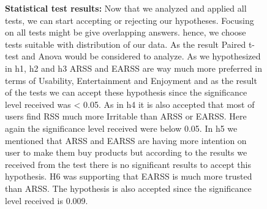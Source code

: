 \documentclass[letterpaper, 10 pt, conference]{ieeeconf}
\begin{document}
\begin{figure}[h!]
\textbf{Statistical test results:} Now that we analyzed and applied all tests, we can start accepting or rejecting our hypotheses. Focusing on all tests might be give overlapping answers. hence, we choose tests suitable with distribution of our data. As the result Paired t-test and Anova would be considered to analyze. 
As we hypothesized in h1, h2 and h3 ARSS and EARSS are way much more preferred in terms of Usability, Entertainment and Enjoyment and as the result of the tests we can accept these hypothesis since the significance level received was < 0.05. As in h4 it is also accepted that most of users find RSS much more Irritable than ARSS or EARSS. Here again the significance level received were below 0.05. In h5 we mentioned that ARSS and EARSS are having more intention on user to make them buy products but according to the results we received from the test there is no significant results to accept this hypothesis. H6 was supporting that EARSS is much more trusted than ARSS. The hypothesis is also accepted since the significance level received is 0.009. 

\end{figure}
\end{document}
